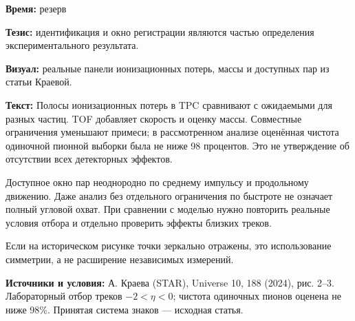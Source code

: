 \textbf{Время:} резерв

\textbf{Тезис:} идентификация и окно регистрации являются частью определения экспериментального результата.

\textbf{Визуал:} реальные панели ионизационных потерь, массы и доступных пар из статьи Краевой.

\textbf{Текст:} Полосы ионизационных потерь в TPC сравнивают с ожидаемыми для разных частиц. TOF добавляет скорость и оценку массы. Совместные ограничения уменьшают примеси; в рассмотренном анализе оценённая чистота одиночной пионной выборки была не ниже 98 процентов. Это не утверждение об отсутствии всех детекторных эффектов.

Доступное окно пар неоднородно по среднему импульсу и продольному движению. Даже анализ без отдельного ограничения по быстроте не означает полный угловой охват. При сравнении с моделью нужно повторить реальные условия отбора и отдельно проверить эффекты близких треков.

Если на историческом рисунке точки зеркально отражены, это использование симметрии, а не расширение независимых измерений.

\textbf{Источники и условия:} А. Краева (STAR), Universe 10, 188 (2024), рис. 2–3. Лабораторный отбор треков \(-2<\eta<0\); чистота одиночных пионов оценена не ниже 98\%. Принятая система знаков — исходная статья.
